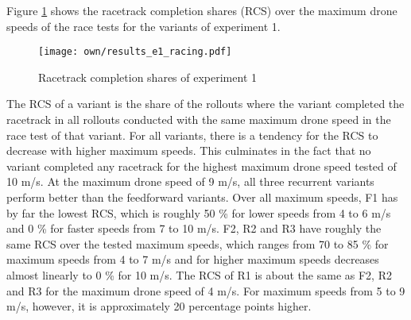 Figure \ref{fig:e1_rcs} shows the racetrack completion shares (RCS)
over the maximum drone speeds of the race tests for the variants of experiment 1.
\begin{figure}
    \centering
    \texttt{[image: own/results\_e1\_racing.pdf]}
    \caption[
        Racetrack completion shares of experiment 1
    ]{
        Racetrack completion shares of experiment 1
    \label{fig:e1_rcs}}
\end{figure}
The RCS of a variant is the share of the rollouts 
where the variant completed the racetrack
in all rollouts conducted with the same maximum drone speed in the race test of that variant.
For all variants, there is a tendency for the RCS to decrease with higher maximum speeds.
This culminates in the fact that no variant completed any racetrack 
for the highest maximum drone speed tested of 10 m/s.
At the maximum drone speed of 9 m/s, all three recurrent variants
perform better than the feedforward variants.
Over all maximum speeds, F1 has by far the lowest RCS,
which is roughly 50 \% for lower speeds from 4 to 6 m/s
and 0 \% for faster speeds from 7 to 10 m/s.
F2, R2 and R3 have roughly the same RCS over the tested maximum speeds,
which ranges from 70 to 85 \% for maximum speeds from 4 to 7 m/s
and for higher maximum speeds decreases almost linearly to 0 \% for 10 m/s.
The RCS of R1 is about the same as F2, R2 and R3
for the maximum drone speed of 4 m/s.
For maximum speeds from 5 to 9 m/s, however,
it is approximately 20 percentage points higher.





